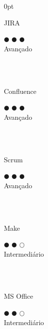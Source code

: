 \documentclass[a4paper]{article}
\begin{document}
\begin{adjustwidth}{\parindent}{0pt}
\begin{minipage}[t]{0.25\textwidth}
 \begin{minipage}{0.65\textwidth}
  \small{JIRA}
 \end{minipage}
 \begin{minipage}{0.3\textwidth}
  \centering $\mdlgblkcircle$ $\mdlgblkcircle$ $\mdlgblkcircle$ \\  \footnotesize{Avançado}
 \end{minipage} \\ \hspace{0pt} \\

 \begin{minipage}{0.65\textwidth}
  \small{Confluence}
 \end{minipage}
 \begin{minipage}{0.3\textwidth}
  \centering $\mdlgblkcircle$ $\mdlgblkcircle$ $\mdlgblkcircle$ \\  \footnotesize{Avançado}
 \end{minipage} \\ \hspace{0pt} \\

 \begin{minipage}{0.65\textwidth}
  \small{Scrum}
 \end{minipage}
 \begin{minipage}{0.3\textwidth}
  \centering $\mdlgblkcircle$ $\mdlgblkcircle$ $\mdlgblkcircle$ \\  \footnotesize{Avançado}
 \end{minipage} \\ \hspace{0pt} \\

 \begin{minipage}{0.65\textwidth}
  \small{Make}
\end{minipage}
\begin{minipage}{0.3\textwidth}
  \centering $\mdlgblkcircle$ $\mdlgblkcircle$ $\mdlgwhtcircle$ \\  \footnotesize{\mbox{Intermediário}}
\end{minipage} \\ \hspace{0pt} \\

 \begin{minipage}{0.65\textwidth}
  \small{MS Office}
\end{minipage}
\begin{minipage}{0.3\textwidth}
  \centering $\mdlgblkcircle$ $\mdlgblkcircle$ $\mdlgwhtcircle$ \\  \footnotesize{\mbox{Intermediário}}
\end{minipage} \\ \hspace{0pt} \\


\end{minipage}
\end{adjustwidth}
\end{document}
